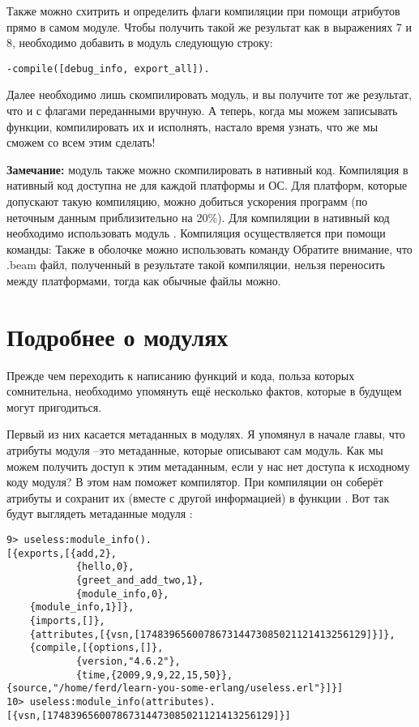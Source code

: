 Также можно схитрить и определить флаги компиляции при помощи атрибутов прямо в самом модуле.
Чтобы получить такой же результат как в выражениях 7 и 8, необходимо добавить в модуль следующую строку: 
\begin{lstlisting}[style=erlang]
-compile([debug_info, export_all]).
\end{lstlisting}

Далее необходимо лишь скомпилировать модуль, и вы получите тот же результат, что и с флагами переданными вручную.
А теперь, когда мы можем записывать функции, компилировать их и исполнять, настало время узнать, что же мы сможем со всем этим сделать!\\ 
\colorbox{lgray}
{
    \begin{minipage}{1\linewidth}
        \textbf{Замечание:} модуль также можно скомпилировать в нативный код.
        Компиляция в нативный код доступна не для каждой платформы и ОС.
        Для платформ, которые допускают такую компиляцию, можно добиться ускорения программ (по неточным данным приблизительно на 20\%).
        Для компиляции в нативный код необходимо использовать модуль . Компиляция осуществляется при помощи команды: 
        Также в оболочке можно использовать команду 
        Обратите внимание, что .beam файл, полученный в результате такой компиляции, нельзя переносить между платформами, тогда как обычные файлы можно.
    \end{minipage}
}
\section{Подробнее о модулях}
\label{more-about-modules}
Прежде чем переходить к написанию функций и кода, польза которых сомнительна, необходимо упомянуть ещё несколько фактов, которые в будущем могут пригодиться.

Первый из них касается метаданных в модулях.
Я упомянул в начале главы, что атрибуты модуля \---это метаданные, которые описывают сам модуль.
Как мы можем получить доступ к этим метаданным, если у нас нет доступа к исходному коду модуля?
В этом нам поможет компилятор.
При компиляции он соберёт атрибуты и сохранит их (вместе с другой информацией) в функции .
Вот так будут выглядеть метаданные модуля :
\begin{lstlisting}[style=erlang]
9> useless:module_info().
[{exports,[{add,2},
            {hello,0},
            {greet_and_add_two,1},
            {module_info,0},
    {module_info,1}]},
    {imports,[]},
    {attributes,[{vsn,[174839656007867314473085021121413256129]}]},
    {compile,[{options,[]},
            {version,"4.6.2"},
            {time,{2009,9,9,22,15,50}},
{source,"/home/ferd/learn-you-some-erlang/useless.erl"}]}]
10> useless:module_info(attributes).
[{vsn,[174839656007867314473085021121413256129]}]
\end{lstlisting}

